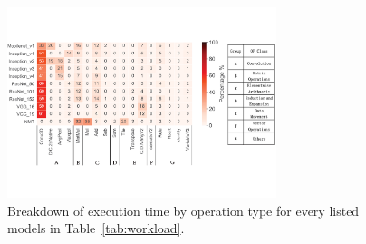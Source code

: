 
\begin{figure}[!t]
\centering
\includegraphics[width=0.7\textwidth]{figure/break11models.pdf}
\caption{ Breakdown of execution time by operation type for every listed models in Table~\ref{tab:workload}.}
 \label{fig:breakdown11}
\end{figure}

